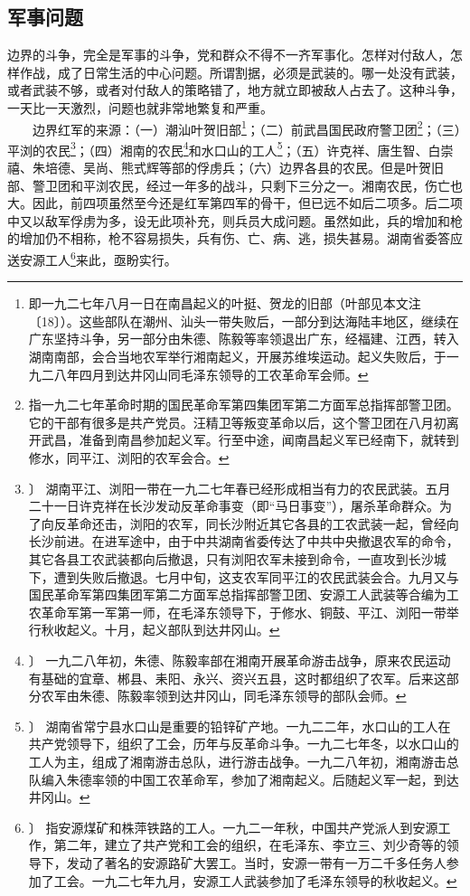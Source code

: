\documentclass[cn,11pt,chinese]{elegantbook}
\def\myformat#1{\hfil\hfil #1}
\begin{document}
\subsection*{\myformat{军事问题}}
边界的斗争，完全是军事的斗争，党和群众不得不一齐军事化。怎样对付敌人，怎样作战，成了日常生活的中心问题。所谓割据，必须是武装的。哪一处没有武装，或者武装不够，或者对付敌人的策略错了，地方就立即被敌人占去了。这种斗争，一天比一天激烈，问题也就非常地繁复和严重。\\
　　边界红军的来源：（一）潮汕叶贺旧部\footnote[8]{ 即一九二七年八月一日在南昌起义的叶挺、贺龙的旧部（叶部见本文注〔18〕）。这些部队在潮州、汕头一带失败后，一部分到达海陆丰地区，继续在广东坚持斗争，另一部分由朱德、陈毅等率领退出广东，经福建、江西，转入湖南南部，会合当地农军举行湘南起义，开展苏维埃运动。起义失败后，于一九二八年四月到达井冈山同毛泽东领导的工农革命军会师。}；（二）前武昌国民政府警卫团\footnote[9]{ 指一九二七年革命时期的国民革命军第四集团军第二方面军总指挥部警卫团。它的干部有很多是共产党员。汪精卫等叛变革命以后，这个警卫团在八月初离开武昌，准备到南昌参加起义军。行至中途，闻南昌起义军已经南下，就转到修水，同平江、浏阳的农军会合。}；（三）平浏的农民\footnote[10]{〕 湖南平江、浏阳一带在一九二七年春已经形成相当有力的农民武装。五月二十一日许克祥在长沙发动反革命事变（即“马日事变”），屠杀革命群众。为了向反革命还击，浏阳的农军，同长沙附近其它各县的工农武装一起，曾经向长沙前进。在进军途中，由于中共湖南省委传达了中共中央撤退农军的命令，其它各县工农武装都向后撤退，只有浏阳农军未接到命令，一直攻到长沙城下，遭到失败后撤退。七月中旬，这支农军同平江的农民武装会合。九月又与国民革命军第四集团军第二方面军总指挥部警卫团、安源工人武装等合编为工农革命军第一军第一师，在毛泽东领导下，于修水、铜鼓、平江、浏阳一带举行秋收起义。十月，起义部队到达井冈山。}；（四）湘南的农民\footnote[11]{〕 一九二八年初，朱德、陈毅率部在湘南开展革命游击战争，原来农民运动有基础的宜章、郴县、耒阳、永兴、资兴五县，这时都组织了农军。后来这部分农军由朱德、陈毅率领到达井冈山，同毛泽东领导的部队会师。}和水口山的工人\footnote[12]{〕 湖南省常宁县水口山是重要的铅锌矿产地。一九二二年，水口山的工人在共产党领导下，组织了工会，历年与反革命斗争。一九二七年冬，以水口山的工人为主，组成了湘南游击总队，进行游击战争。一九二八年初，湘南游击总队编入朱德率领的中国工农革命军，参加了湘南起义。后随起义军一起，到达井冈山。}；（五）许克祥、唐生智、白崇禧、朱培德、吴尚、熊式辉等部的俘虏兵；（六）边界各县的农民。但是叶贺旧部、警卫团和平浏农民，经过一年多的战斗，只剩下三分之一。湘南农民，伤亡也大。因此，前四项虽然至今还是红军第四军的骨干，但已远不如后二项多。后二项中又以敌军俘虏为多，设无此项补充，则兵员大成问题。虽然如此，兵的增加和枪的增加仍不相称，枪不容易损失，兵有伤、亡、病、逃，损失甚易。湖南省委答应送安源工人\footnote[13]{〕 指安源煤矿和株萍铁路的工人。一九二一年秋，中国共产党派人到安源工作，第二年，建立了共产党和工会的组织，在毛泽东、李立三、刘少奇等的领导下，发动了著名的安源路矿大罢工。当时，安源一带有一万二千多任务人参加了工会。一九二七年九月，安源工人武装参加了毛泽东领导的秋收起义。}来此，亟盼实行。\\
\end{document}
